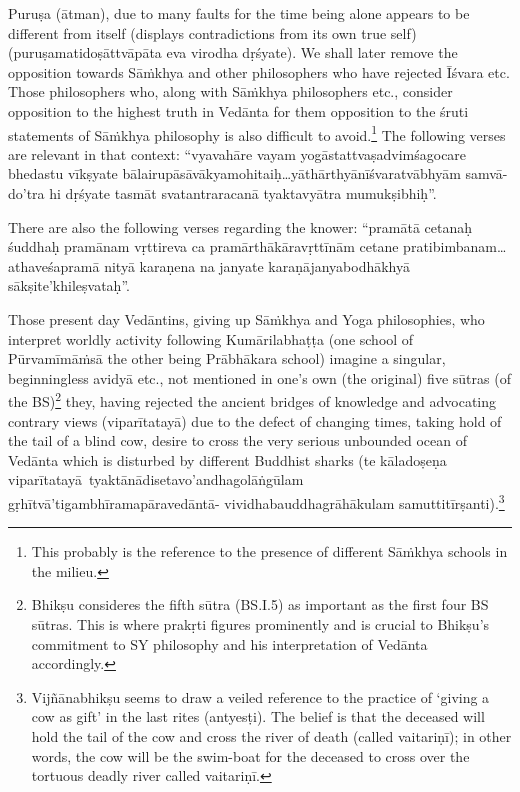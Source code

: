 Puruṣa (ātman), due to many faults for the time being alone appears to be different from itself (displays contradictions from its own true self) (puruṣamatidoṣāttvāpāta eva virodha dṛśyate). We shall later remove  the opposition towards Sāṁkhya and other philosophers who have rejected Īśvara etc. Those philosophers who, along with Sāṁkhya philosophers etc., consider opposition to the highest truth in Vedānta for them opposition to the śruti statements of Sāṁkhya philosophy is also difficult to avoid.\footnote{This probably is the reference to the presence of different Sāṁkhya schools in the milieu.} The following verses are relevant in that context: “vyavahāre vayam yogāstattvaṣadvimśagocare bhedastu vīkṣyate bālairupāsāvākyamohitaiḥ…yāthārthyānīśvaratvābhyām samvā-\break\hbox{do’\-tra} hi dṛśyate tasmāt svatantraracanā tyaktavyātra mumukṣibhiḥ”.

There are also the following verses regarding the knower: “pramātā cetanaḥ śuddhaḥ pramānam vṛttireva ca pramārthākāravṛttīnām cetane pratibimbanam…athaveśapramā nityā karaṇena na janyate karaṇājanyabodhākhyā sākṣite’khileṣvataḥ”.

Those present day Vedāntins, giving up Sāṁkhya and Yoga philosophies, who interpret worldly activity following Kumārilabhaṭṭa (one school of Pūrvamīmāṁsā the other being Prābhākara school) imagine a singular, beginningless avidyā etc., not mentioned in one’s own (the original) five sūtras (of the BS)\footnote{Bhikṣu consideres the fifth sūtra (BS.I.5) as important as the first four BS sūtras. This is where prakṛti figures prominently and is crucial to Bhikṣu’s commitment to SY philosophy and his interpretation of Vedānta accordingly.} they, having rejected the ancient bridges of knowledge and advocating contrary views (viparītatayā) due to the defect of changing times, taking hold of the tail of a blind cow, desire to cross the very serious unbounded ocean of Vedānta which is disturbed by different Buddhist sharks (te kāladoṣeṇa  viparītatayā tya\-ktānādisetavo’andhagolāṅgūlam gṛhītvā’tigambhīramapāravedāntā- vividhabauddhagrāhākulam samuttitīrṣanti).\footnote{Vijñānabhikṣu seems to draw a veiled reference to the practice of ‘giving a cow as gift’ in the last rites (antyesṭi). The belief is that the deceased will hold the tail of the cow and cross the river of death (called vaitariṇī); in other words, the cow will be the swim-boat for the deceased to cross over the tortuous deadly river called vaitariṇī.}



